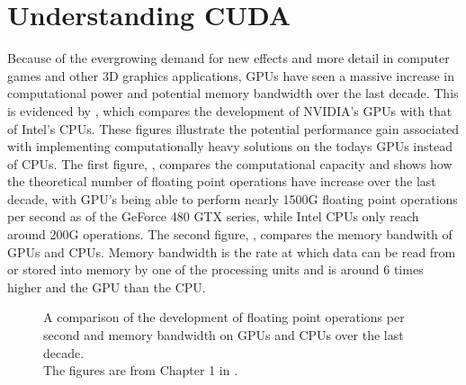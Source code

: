 \chapter{Understanding CUDA}\label{chp:GPGPU}



Because of the evergrowing demand for new effects and more detail in computer
games and other 3D graphics applications, GPUs have seen a massive increase in
computational power and potential memory bandwidth over the last decade. This is
evidenced by , which compares the development of
NVIDIA's GPUs with that of Intel's CPUs. These figures illustrate the potential
performance gain associated with implementing computationally heavy solutions on
the todays GPUs instead of CPUs. The first figure, ,
compares the computational capacity and shows how the theoretical number of
floating point operations have increase over the last decade, with GPU's being
able to perform nearly 1500G floating point operations per second as of the
GeForce 480 GTX series, while Intel CPUs only reach around 200G operations. The
second figure, , compares the memory bandwith of
GPUs and CPUs. Memory bandwidth is the rate at which data can be read from or
stored into memory by one of the processing units and is around 6 times higher
and the GPU than the CPU.

\begin{figure}
  \centering 

  
  \caption[Comparison of FLOPS and memory bandwidth on GPUs and CPUs.]{A comparison
    of the development of floating point operations per second and memory
    bandwidth on GPUs and CPUs over the last decade. \\The figures are from Chapter 1 in
    .}\label{fig:gpuCpuCompare}
\end{figure}


